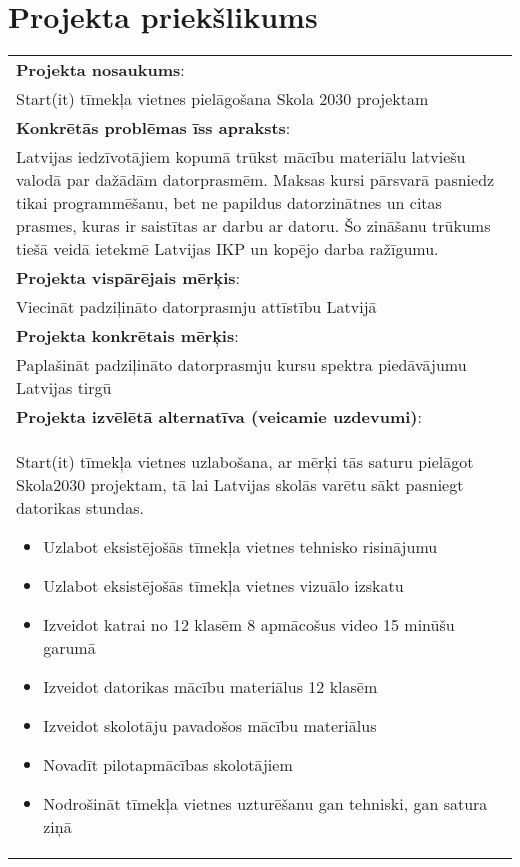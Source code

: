 \section{Projekta priekšlikums}
\begin{table}[h!]
  \begin{tabular}{|p{}|}
    \hline
      \textbf{Projekta nosaukums}:\\
      Start(it) tīmekļa vietnes pielāgošana Skola 2030 projektam \\
    \hline
      \textbf{Konkrētās problēmas īss apraksts}:\\
      Latvijas iedzīvotājiem kopumā trūkst mācību materiālu latviešu valodā par dažādām
      datorprasmēm. Maksas kursi pārsvarā pasniedz tikai programmēšanu, bet ne papildus
      datorzinātnes un citas prasmes, kuras ir saistītas ar darbu ar datoru. Šo zināšanu
      trūkums tiešā veidā ietekmē Latvijas IKP un kopējo darba ražīgumu. \\
    \hline
    \textbf{Projekta vispārējais mērķis}: \\
      Viecināt padziļināto datorprasmju attīstību Latvijā \\
    \hline
      \textbf{Projekta konkrētais mērķis}: \\
      Paplašināt padziļināto datorprasmju kursu spektra piedāvājumu Latvijas tirgū \\
    \hline
    \textbf{Projekta izvēlētā alternatīva (veicamie uzdevumi)}:\\
      Start(it) tīmekļa vietnes uzlabošana, ar mērķi tās saturu pielāgot Skola2030 projektam,
      tā lai Latvijas skolās varētu sākt pasniegt datorikas stundas.
      \begin{itemize}
        \item Uzlabot eksistējošās tīmekļa vietnes tehnisko risinājumu
        \item Uzlabot eksistējošās tīmekļa vietnes vizuālo izskatu
        \item Izveidot katrai no 12 klasēm 8 apmācošus video 15 minūšu garumā
        \item Izveidot datorikas mācību materiālus 12 klasēm
        \item Izveidot skolotāju pavadošos mācību materiālus
        \item Novadīt pilotapmācības skolotājiem
        \item Nodrošināt tīmekļa vietnes uzturēšanu gan tehniski, gan satura ziņā
      \end{itemize}\\

\end{tabular}
\end{table}
